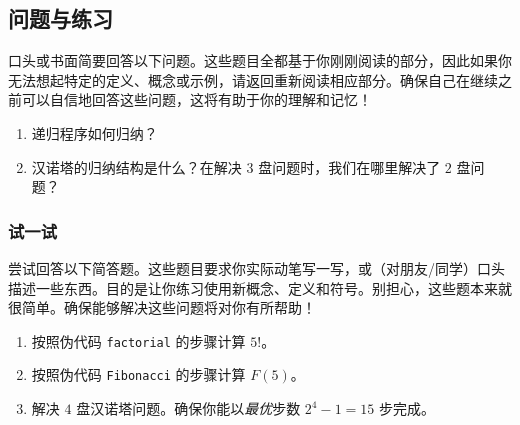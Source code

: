 \subsection{问题与练习}

口头或书面简要回答以下问题。这些题目全都基于你刚刚阅读的部分，因此如果你无法想起特定的定义、概念或示例，请返回重新阅读相应部分。确保自己在继续之前可以自信地回答这些问题，这将有助于你的理解和记忆！

\begin{enumerate}[label=(\arabic*)]
    \item 递归程序如何归纳？
    \item 汉诺塔的归纳结构是什么？在解决 $3$ 盘问题时，我们在哪里解决了 $2$ 盘问题？
\end{enumerate}

\subsubsection*{试一试}

尝试回答以下简答题。这些题目要求你实际动笔写一写，或（对朋友/同学）口头描述一些东西。目的是让你练习使用新概念、定义和符号。别担心，这些题本来就很简单。确保能够解决这些问题将对你有所帮助！

\begin{enumerate}[label=(\arabic*)]
    \item 按照伪代码 \verb|factorial| 的步骤计算 $5!$。
    \item 按照伪代码 \verb|Fibonacci| 的步骤计算 $F(5)$。
    \item 解决 $4$ 盘汉诺塔问题。确保你能以\emph{最优}步数 $2^4 - 1 = 15$ 步完成。
\end{enumerate}